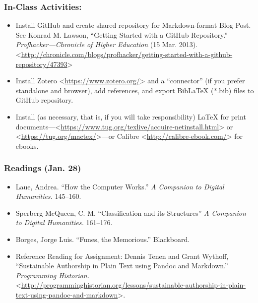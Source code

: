 \documentclass[]{article}
\begin{document}
\subsubsection{In-Class Activities:}\label{in-class-activities-1}

\begin{itemize}
\itemsep1pt\parskip0pt
\item
  Install GitHub and create shared repository for Markdown-format Blog
  Post. See Konrad M. Lawson, ``Getting Started with a GitHub
  Repository.'' \emph{Profhacker---Chronicle of Higher Education} (15
  Mar. 2013).
  \textless{}\url{http://chronicle.com/blogs/profhacker/getting-started-with-a-github-repository/47393}\textgreater{}
\item
  Install Zotero \textless{}\url{https://www.zotero.org/}\textgreater{}
  and a ``connector'' (if you prefer standalone and browser), add
  references, and export BibLaTeX (*.bib) files to GitHub repository.
\item
  Install (as necessary, that is, if you will take responsibility) LaTeX
  for print
  documents---\textless{}\url{https://www.tug.org/texlive/acquire-netinstall.html}\textgreater{}
  or \textless{}\url{https://tug.org/mactex/}\textgreater{}---or Calibre
  \textless{}\url{http://calibre-ebook.com/}\textgreater{} for ebooks.
\end{itemize}

\subsubsection{Readings (Jan. 28)}\label{readings-jan.-28}

\begin{itemize}
\itemsep1pt\parskip0pt
\item
  Laue, Andrea. ``How the Computer Works.'' \emph{A Companion to Digital
  Humanities.} 145--160.
\item
  Sperberg-McQueen, C. M. ``Classification and its Structures'' \emph{A
  Companion to Digital Humanities.} 161--176.
\item
  Borges, Jorge Luis. ``Funes, the Memorious.'' Blackboard.
\item
  Reference Reading for Assignment: Dennis Tenen and Grant Wythoff,
  ``Sustainable Authorship in Plain Text using Pandoc and Markdown.''
  \emph{Programming Historian.}
  \textless{}\url{http://programminghistorian.org/lessons/sustainable-authorship-in-plain-text-using-pandoc-and-markdown}\textgreater{}.
\end{itemize}
\end{document}
